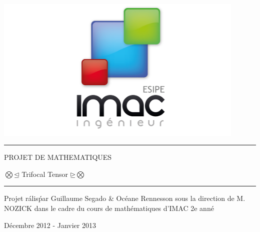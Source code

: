 \documentclass[a4paper,11pt,fleqn]{report}
\author{Guillaume SEGADO \and Oc\'eane RENNESSON}
\begin{document}
	
	\begin{titlepage}
	\begin{center}\includegraphics[width=0.90\textwidth]{./logoimac.jpg}\end{center}
	\vspace*{2cm}
	\hrule
	\begin{center} {\Huge PROJET DE MATHEMATIQUES}\end{center}
	\vspace*{0.5cm}
	\begin{center} \begin{em}{\LARGE $\bigotimes\unlhd$ Trifocal Tensor $\unrhd\bigotimes$}\end{em}\end{center}
	\hrule
	\vspace*{5cm}
	 {\Large Projet r\'alis\' par Guillaume Segado \& Oc\'eane Rennesson sous la direction de M. NOZICK dans le cadre du cours de math\'ematiques d'IMAC 2e ann\'e}
	\vspace*{1cm}
	\begin{center}D\'ecembre 2012 - Janvier 2013 \end{center}
	\end{titlepage}
	
\end{document}
